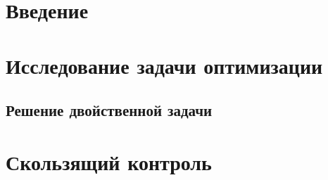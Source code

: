 \documentclass[12pt]{article}
\begin{document}
	
	\newpage \tableofcontents
	\newpage 
	\newpage 

	\section{Введение} 
		
	\section{Исследование задачи оптимизации}
		\subsection{Решение двойственной задачи}	
	\section{Скользящий контроль}
		
		
		
\end{document}
